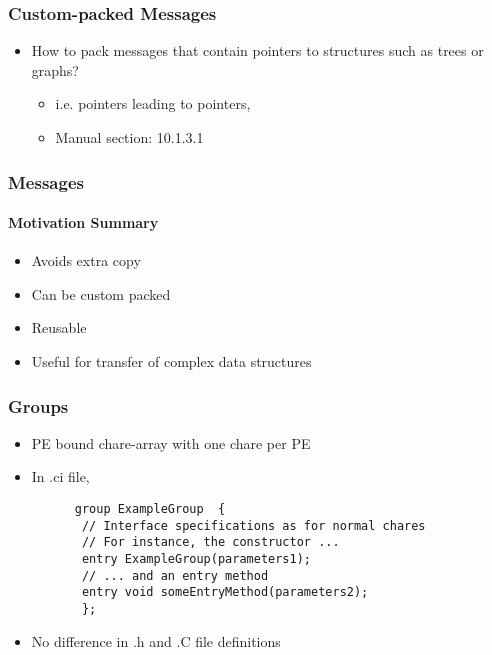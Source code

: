 \begin{frame}[fragile]
  \frametitle{Custom-packed Messages}
  \begin{itemize}
    \item How to pack messages that contain pointers to structures such as trees or graphs?
    \begin{itemize}
       \item i.e. pointers leading to pointers,
       \item Manual section: 10.1.3.1
    \end{itemize}
  \end{itemize}
\end{frame}

\begin{frame}[fragile]
  \frametitle{Messages}
  \framesubtitle{Motivation Summary}
  \begin{itemize}
    \item Avoids extra copy
    \item Can be custom packed
    \item Reusable
    \item Useful for transfer of complex data structures
  \end{itemize}
\end{frame}

\begin{frame}[fragile]
  \frametitle{Groups}
  \begin{itemize}
    \item PE bound chare-array with one chare per PE
    \item In .ci file, 
    \begin{lstlisting}
      group ExampleGroup  {
       // Interface specifications as for normal chares
       // For instance, the constructor ...
       entry ExampleGroup(parameters1);
       // ... and an entry method
       entry void someEntryMethod(parameters2);
       };
    \end{lstlisting}
    \item No difference in .h and .C file definitions
  \end{itemize}
\end{frame}

